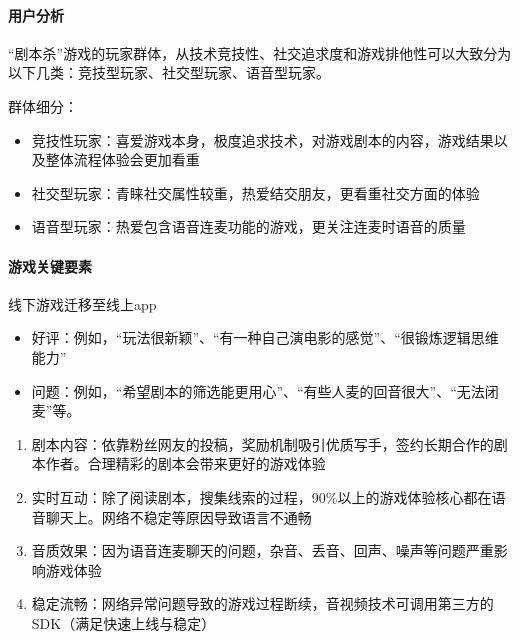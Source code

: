 \documentclass[letterpaper,10pt,english]{sphinxmanual}
\begin{document}
\paragraph{用户分析}
\label{\detokenize{chapter_experience/jubensha:id5}}
“剧本杀”游戏的玩家群体，从技术竞技性、社交追求度和游戏排他性可以大致分为以下几类：竞技型玩家、社交型玩家、语音型玩家。

群体细分：
\begin{itemize}
\item {} 
竞技性玩家：喜爱游戏本身，极度追求技术，对游戏剧本的内容，游戏结果以及整体流程体验会更加看重

\item {} 
社交型玩家：青睐社交属性较重，热爱结交朋友，更看重社交方面的体验

\item {} 
语音型玩家：热爱包含语音连麦功能的游戏，更关注连麦时语音的质量

\end{itemize}


\paragraph{游戏关键要素}
\label{\detokenize{chapter_experience/jubensha:id6}}
线下游戏迁移至线上app
\begin{itemize}
\item {} 
好评：例如，“玩法很新颖”、“有一种自己演电影的感觉”、“很锻炼逻辑思维能力”

\item {} 
问题：例如，“希望剧本的筛选能更用心”、“有些人麦的回音很大”、“无法闭麦”等。

\end{itemize}
\begin{enumerate}
%
\item {} 
剧本内容：依靠粉丝网友的投稿，奖励机制吸引优质写手，签约长期合作的剧本作者。合理精彩的剧本会带来更好的游戏体验

\item {} 
实时互动：除了阅读剧本，搜集线索的过程，90\%以上的游戏体验核心都在语音聊天上。网络不稳定等原因导致语言不通畅

\item {} 
音质效果：因为语音连麦聊天的问题，杂音、丢音、回声、噪声等问题严重影响游戏体验

\item {} 
稳定流畅：网络异常问题导致的游戏过程断续，音视频技术可调用第三方的SDK（满足快速上线与稳定）

\end{enumerate}
\end{document}
